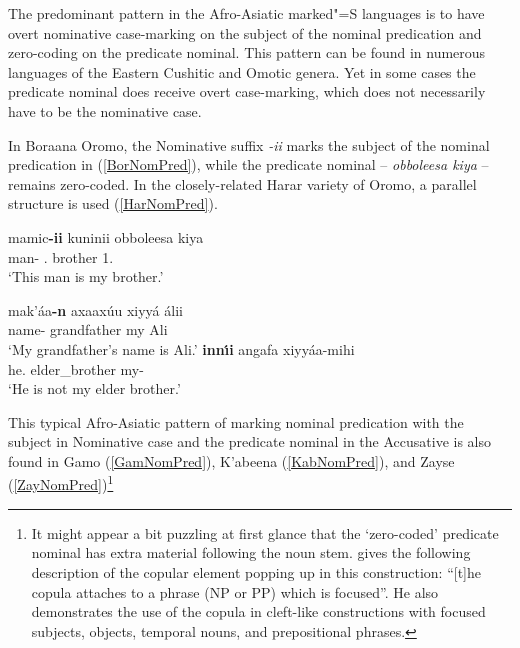 The predominant pattern in the Afro-Asiatic marked"=S languages is to have overt nominative case-marking on the subject of the nominal predication and zero-coding on the predicate nominal. 
This pattern can be found in numerous languages of the Eastern Cushitic and Omotic genera.
Yet in some cases the predicate nominal does receive overt case-marking, which does not necessarily have to be the nominative case. 

In Boraana Oromo, the Nominative suffix \emph{-ii} marks the subject of the nominal predication in (\ref{BorNomPred}), while the predicate nominal -- \emph{obboleesa kiya} -- remains zero-coded. 
In the closely-related Harar variety of Oromo, a parallel structure is used (\ref{HarNomPred}). 


\begin{exe}\ex\label{BorNomPred}
\gll mamic\textbf{-ii} kuninii obboleesa kiya\\
man-\nom{} \dem{}.\nom{} brother 1\sg{}.\poss{}\\
\glt `This man is my brother.' \end{exe}

\begin{exe}\ex\label{HarNomPred}
\begin{xlist}\ex\gll mak'\'aa\textbf{-n} axaax\'uu xiyy\'a \'alii\\
name-\nom{} grandfather my Ali\\
\glt `My grandfather's name is Ali.'
\ex \gll \textbf{inn\'\i i} angafa xiyy\'aa-mihi\\
he.\nom{} {elder\_brother} my-\Neg{}\\
\glt `He is not my elder brother.'
\end{xlist}
\end{exe}

This typical Afro-Asiatic pattern of marking nominal predication with the subject in Nominative case  and the predicate nominal in the Accusative is also found in Gamo (\ref{GamNomPred}), K'abeena (\ref{KabNomPred}), and Zayse (\ref{ZayNomPred})\footnote{It might appear a bit puzzling at first glance that the `zero-coded' predicate nominal has extra material following the noun stem. 
\citet[280--281]{Hayward:1990} gives the following description of the copular element popping up in this construction: ``[t]he copula attaches to a phrase (NP or PP) which is focused''. 
He also demonstrates the use of the copula in cleft-like constructions with focused subjects, objects, temporal nouns, and prepositional phrases.}


